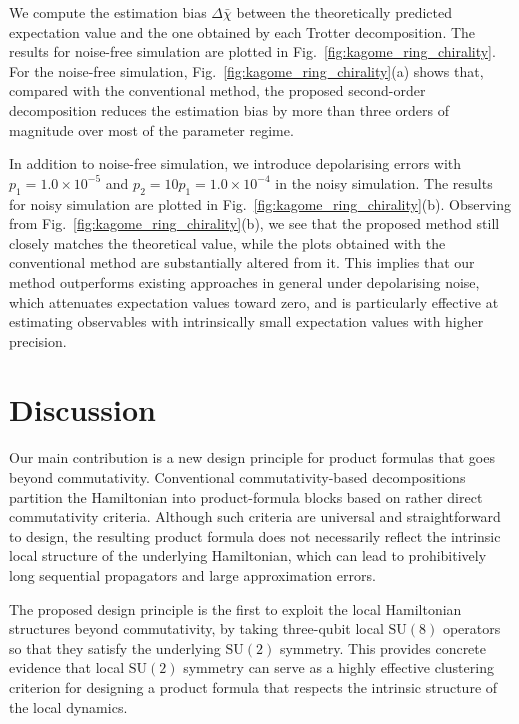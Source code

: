 \documentclass[aps,showpacs,amsmath,amssymb,twocolumn,prx,longbibliography,superscriptaddress,notitlepage,floatfix,10pt]{revtex4-2}
\begin{document}
We compute the estimation bias $\Delta\bar{\chi}$ between the theoretically predicted expectation value and the one obtained by each Trotter decomposition.
The results for noise-free simulation are plotted in Fig.~\ref{fig:kagome_ring_chirality}.
For the noise-free simulation, Fig.~\ref{fig:kagome_ring_chirality}(a) shows that, compared with the conventional method, the proposed second-order decomposition reduces the estimation bias by more than three orders of magnitude over most of the parameter regime.

In addition to noise-free simulation, we introduce depolarising errors with $p_{1} = 1.0\times 10^{-5}$ and $p_{2} = 10 p_{1} = 1.0\times 10^{-4}$ in the noisy simulation.
The results for noisy simulation are plotted in Fig.~\ref{fig:kagome_ring_chirality}(b).
Observing from Fig.~\ref{fig:kagome_ring_chirality}(b), we see that the proposed method still closely matches the theoretical value, while the plots obtained with the conventional method are substantially altered from it.
This implies that our method outperforms existing approaches in general under depolarising noise, which attenuates expectation values toward zero, and is particularly effective at estimating observables with intrinsically small expectation values with higher precision.



\section{Discussion}


Our main contribution is a new design principle for product formulas that goes beyond commutativity.
Conventional commutativity-based decompositions partition the Hamiltonian into product-formula blocks based on rather direct commutativity criteria.
Although such criteria are universal and straightforward to design, the resulting product formula does not necessarily reflect the intrinsic local structure of the underlying Hamiltonian, which can lead to prohibitively long sequential propagators and large approximation errors.

The proposed design principle is the first to exploit the local Hamiltonian structures beyond commutativity, by taking three-qubit local $\mathrm{SU}(8)$ operators so that they satisfy the underlying $\mathrm{SU}(2)$ symmetry.
This provides concrete evidence that local $\mathrm{SU}(2)$ symmetry can serve as a highly effective clustering criterion for designing a product formula that respects the intrinsic structure of the local dynamics.
\end{document}
